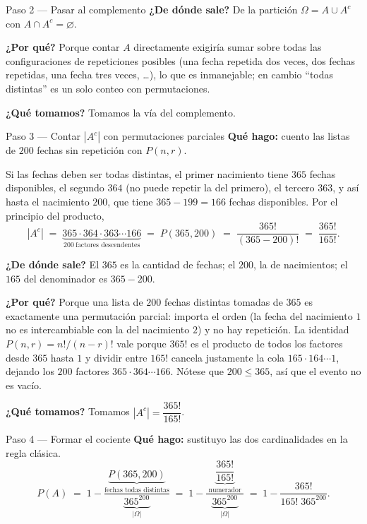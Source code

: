 \documentclass[11pt]{article}
\begin{document}
\begin{sol}
\begin{paso}{Paso 2 --- Pasar al complemento}
\textbf{¿De d\'onde sale?} De la partici\'on $\Omega=A\cup A^{c}$ con $A\cap A^{c}=\varnothing$.

\textbf{¿Por qu\'e?} Porque contar $A$ directamente exigir\'ia sumar sobre todas las configuraciones de repeticiones posibles (una fecha repetida dos veces, dos fechas repetidas, una fecha tres veces, \dots), lo que es inmanejable; en cambio ``todas distintas'' es un solo conteo con permutaciones.

\textbf{¿Qu\'e tomamos?} Tomamos la v\'ia del complemento.
\end{paso}

\begin{paso}{Paso 3 --- Contar $|A^{c}|$ con permutaciones parciales}
\textbf{Qu\'e hago:} cuento las listas de $200$ fechas sin repetici\'on con $P(n,r)$.

Si las fechas deben ser todas distintas, el primer nacimiento tiene $365$ fechas disponibles, el segundo $364$ (no puede repetir la del primero), el tercero $363$, y as\'i hasta el nacimiento $200$, que tiene $365-199=166$ fechas disponibles. Por el principio del producto,
\[
|A^{c}| \;=\; \underbrace{365\cdot 364\cdot 363\cdots 166}_{200\ \text{factores descendentes}} \;=\; P(365,200)\;=\;\frac{365!}{(365-200)!}\;=\;\frac{365!}{165!}.
\]

\textbf{¿De d\'onde sale?} El $365$ es la cantidad de fechas; el $200$, la de nacimientos; el $165$ del denominador es $365-200$.

\textbf{¿Por qu\'e?} Porque una lista de $200$ fechas distintas tomadas de $365$ es exactamente una permutaci\'on parcial: importa el orden (la fecha del nacimiento $1$ no es intercambiable con la del nacimiento $2$) y no hay repetici\'on. La identidad $P(n,r)=n!/(n-r)!$ vale porque $365!$ es el producto de todos los factores desde $365$ hasta $1$ y dividir entre $165!$ cancela justamente la cola $165\cdot 164\cdots 1$, dejando los $200$ factores $365\cdot 364\cdots 166$. N\'otese que $200\le 365$, as\'i que el evento no es vac\'io.

\textbf{¿Qu\'e tomamos?} Tomamos $|A^{c}|=\dfrac{365!}{165!}$.
\end{paso}

\begin{paso}{Paso 4 --- Formar el cociente}
\textbf{Qu\'e hago:} sustituyo las dos cardinalidades en la regla cl\'asica.
\[
P(A)\;=\;1-\frac{\underbrace{P(365,200)}_{\text{fechas todas distintas}}}{\underbrace{365^{200}}_{|\Omega|}}
\;=\;1-\frac{\ \underbrace{\dfrac{365!}{165!}}_{\text{numerador}}\ }{\underbrace{365^{200}}_{|\Omega|}}
\;=\;1-\frac{365!}{165!\;365^{200}} .
\]


\end{paso}
\end{sol}
\end{document}
